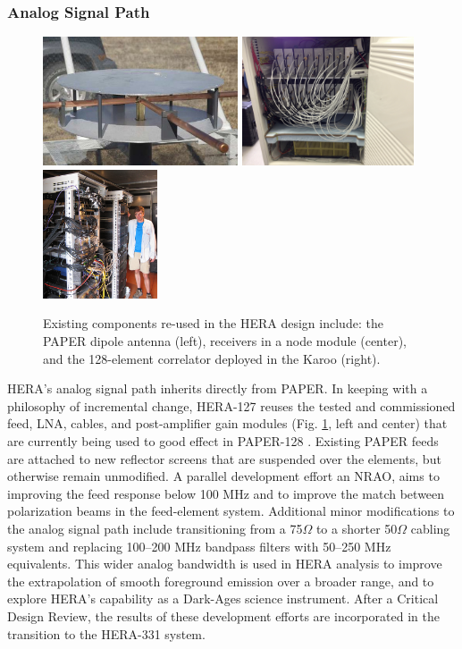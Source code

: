 \documentclass[preprint]{aastex}
\newcommand{\Mycitep}[1]{{\bf \citep{#1}}}
\newcommand{\compress}{\vspace{-0.25in}}
\newcommand{\Caption}[4]{\vspace{#1}\renewcommand{\baselinestretch}{#2}\caption{#4}\vspace{#3}}
\begin{document}
\compress
\subsubsection{Analog Signal Path}

\begin{figure}[t]
    \centering
        \includegraphics[height=1.5in]{plots/new_antenna_closeup.jpg}
        \includegraphics[height=1.5in]{plots/Engineering/recv_node.png}
        \includegraphics[height=1.5in]{plots/Engineering/digital.png}
    \Caption{-0.1in}{0.99}{-0.1in}{\small
    Existing components re-used in the HERA design include:
    the PAPER dipole antenna (left), 
    receivers in a node module (center), and
    the 128-element correlator deployed in the Karoo (right).
}\label{fig:components}
\end{figure}

HERA's analog signal path inherits directly from PAPER.
In keeping with a philosophy of
incremental change,
HERA-127 reuses the tested and commissioned feed, LNA, cables, and post-amplifier gain modules
(Fig. \ref{fig:components}, left and center) that are currently being
used to good effect in PAPER-128 \Mycitep{parsons_et_al2010}.  Existing PAPER feeds are attached to new
reflector screens that are suspended over the elements, but otherwise remain unmodified.
A parallel development effort an NRAO, aims to improving the feed response below
100 MHz 
and to improve the match between polarization beams in the feed-element system.  
Additional
minor modifications to the analog signal path include transitioning from a 75$\Omega$ to a
shorter 50$\Omega$ cabling system and replacing 100--200 MHz bandpass filters with 50--250 MHz equivalents.
This wider analog bandwidth is used in HERA analysis to improve the extrapolation of smooth foreground
emission over a broader range, and to explore HERA's capability as a Dark-Ages science instrument.
After a Critical Design Review, the results of these development efforts are incorporated in
the transition to the HERA-331 system.  
\end{document}
